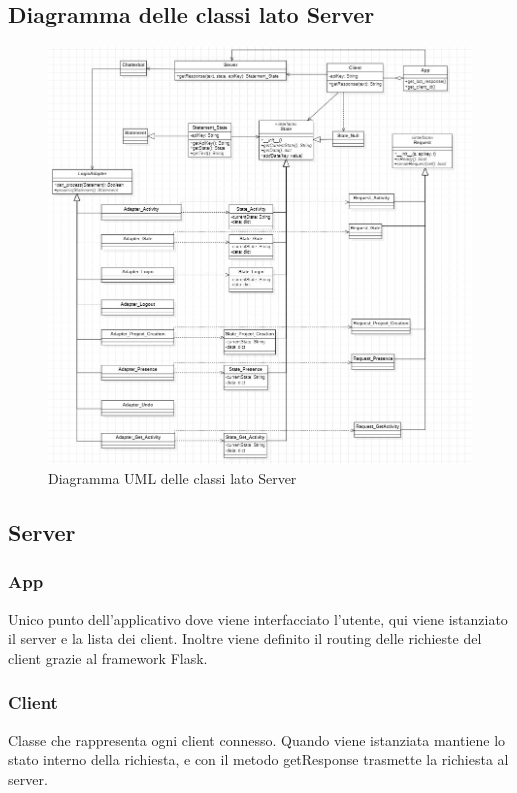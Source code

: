 \subsection{Diagramma delle classi lato Server}
	\begin{figure}[H]
	\centering\includegraphics[scale=0.70]{images/diagramma_classi.jpg}
    \caption{Diagramma UML delle classi lato Server}
	\end{figure}

\newpage

\subsection{Server}
\subsubsection{App} Unico punto dell'applicativo dove viene interfacciato l'utente, qui viene istanziato il server e la lista dei client. Inoltre viene definito il routing delle richieste del client grazie al framework Flask. 
\subsubsection{Client} Classe che rappresenta ogni client connesso. Quando viene istanziata mantiene lo stato interno della richiesta, e con il metodo getResponse trasmette la richiesta al server.
